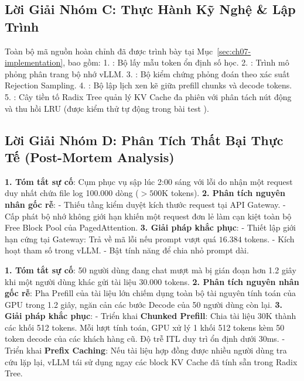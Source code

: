 \subsection{Lời Giải Nhóm C: Thực Hành Kỹ Nghệ \& Lập Trình}
Toàn bộ mã nguồn hoàn chỉnh đã được trình bày tại Mục~\ref{sec:ch07-implementation}, bao gồm:
1. : Bộ lấy mẫu token ổn định số học.
2. : Trình mô phỏng phân trang bộ nhớ vLLM.
3. : Bộ kiểm chứng phỏng đoán theo xác suất Rejection Sampling.
4. : Bộ lập lịch xen kẽ giữa prefill chunks và decode tokens.
5. : Cây tiền tố Radix Tree quản lý KV Cache đa phiên với phân tách nút động và thu hồi LRU (được kiểm thử tự động trong bài test ).

\subsection{Lời Giải Nhóm D: Phân Tích Thất Bại Thực Tế (Post-Mortem Analysis)}

\begin{debugbox}
\textbf{1. Tóm tắt sự cố}: Cụm phục vụ sập lúc 2:00 sáng với lỗi  do nhận một request duy nhất chứa file log 100.000 dòng ($>500\text{K}$ tokens).
\textbf{2. Phân tích nguyên nhân gốc rễ}:
- Thiếu tầng kiểm duyệt kích thước request tại API Gateway.
- Cấp phát bộ nhớ không giới hạn khiến một request đơn lẻ làm cạn kiệt toàn bộ Free Block Pool của PagedAttention.
\textbf{3. Giải pháp khắc phục}:
- Thiết lập giới hạn cứng tại Gateway: Trả về mã lỗi  nếu prompt vượt quá $16.384$ tokens.
- Kích hoạt tham số  trong vLLM.
- Bật tính năng  để chia nhỏ prompt dài.
\end{debugbox}

\begin{debugbox}
\textbf{1. Tóm tắt sự cố}: 50 người dùng đang chat mượt mà bị gián đoạn hơn 1.2 giây khi một người dùng khác gửi tài liệu 30.000 tokens.
\textbf{2. Phân tích nguyên nhân gốc rễ}:
Pha Prefill của tài liệu lớn chiếm dụng toàn bộ tài nguyên tính toán của GPU trong 1.2 giây, ngăn cản các bước Decode của 50 người dùng còn lại.
\textbf{3. Giải pháp khắc phục}:
- Triển khai \textbf{Chunked Prefill}: Chia tài liệu 30K thành các khối 512 tokens. Mỗi lượt tính toán, GPU xử lý 1 khối 512 tokens kèm 50 token decode của các khách hàng cũ. Độ trễ ITL duy trì ổn định dưới 30ms.
- Triển khai \textbf{Prefix Caching}: Nếu tài liệu hợp đồng được nhiều người dùng tra cứu lặp lại, vLLM tái sử dụng ngay các block KV Cache đã tính sẵn trong Radix Tree.
\end{debugbox}

